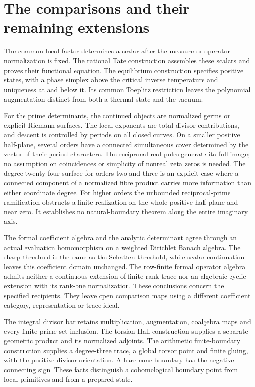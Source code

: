 \section{The comparisons and their remaining extensions}

The common local factor determines a scalar after the measure or
operator normalization is fixed. The rational Tate construction
assembles these scalars and proves their functional equation. The
equilibrium construction specifies positive states, with a phase
simplex above the critical inverse temperature and uniqueness at
and below it. Its common Toeplitz restriction leaves the polynomial
augmentation distinct from both a thermal state and the vacuum.

For the prime determinants, the continued objects are normalized germs
on explicit Riemann surfaces. The local exponents are total divisor
contributions, and descent is controlled by periods on all closed
curves. On a smaller positive half-plane, several orders have a
connected simultaneous cover determined by the vector of their
period characters. The reciprocal-real poles generate its full image;
no assumption on coincidences or simplicity of nonreal zeta zeros is
needed. The degree-twenty-four surface for orders two and three is
an explicit case where a connected component of a normalized fibre
product carries more information than either coordinate degree.
For higher orders the unbounded reciprocal-prime ramification
obstructs a finite realization on the whole positive half-plane and
near zero. It establishes no natural-boundary theorem along the
entire imaginary axis.

The formal coefficient algebra and the analytic determinant agree
through an actual evaluation homomorphism on a weighted Dirichlet
Banach algebra. The sharp threshold is the same as the Schatten
threshold, while scalar continuation leaves this coefficient domain
unchanged. The row-finite formal operator algebra admits neither a
continuous extension of finite-rank trace nor an algebraic cyclic
extension with its rank-one normalization. These conclusions concern
the specified recipients. They leave open comparison maps using a
different coefficient category, representation or trace ideal.

The integral divisor bar retains multiplication, augmentation,
coalgebra maps and every finite prime-set inclusion. The torsion
Hall construction supplies a separate geometric product and its
normalized adjoints. The arithmetic finite-boundary construction
supplies a degree-three trace, a global torsor point and finite
gluing, with the positive divisor orientation. A bare cone boundary
has the negative connecting sign. These facts distinguish a
cohomological boundary point from local primitives and from a
prepared state.

